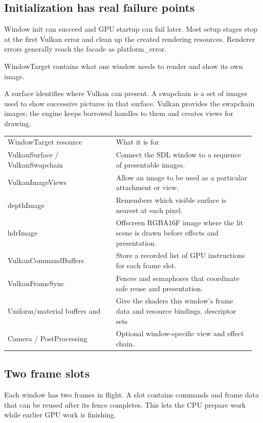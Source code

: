 \documentclass[11pt,a4paper]{article}
\begin{document}
\subsection*{Initialization has real failure points}
Window init can succeed and GPU startup can fail later. Most setup stages stop at the first Vulkan error and clean up the created rendering resources. Renderer errors generally reach the facade as platform\_error.

\label{core-34}
WindowTarget contains what one window needs to render and show its own image.

A surface identifies where Vulkan can present. A swapchain is a set of images used to show successive pictures in that surface. Vulkan provides the swapchain images; the engine keeps borrowed handles to them and creates views for drawing.

{\small
\begin{longtable}{@{}p{0.42\linewidth}p{0.54\linewidth}@{}}
WindowTarget resource & What it is for \\
VulkanSurface / VulkanSwapchain & Connect the SDL window to a sequence of presentable images. \\
VulkanImageViews & Allow an image to be used as a particular attachment or view. \\
depthImage & Remembers which visible surface is nearest at each pixel. \\
hdrImage & Offscreen RGBA16F image where the lit scene is drawn before effects and presentation. \\
VulkanCommandBuffers & Store a recorded list of GPU instructions for each frame slot. \\
VulkanFrameSync & Fences and semaphores that coordinate safe reuse and presentation. \\
Uniform/material buffers and & Give the shaders this window's frame data and resource bindings. descriptor sets \\
Camera / PostProcessing & Optional window-specific view and effect chain. \\
\end{longtable}
}

\subsection*{Two frame slots}
Each window has two frames in flight. A slot contains commands and frame data that can be reused after its fence completes. This lets the CPU prepare work while earlier GPU work is finishing.
\end{document}
